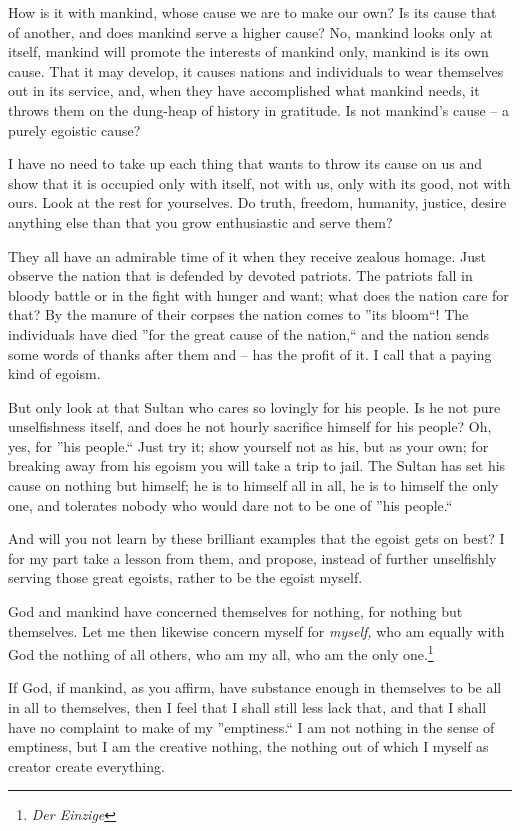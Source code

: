 \documentclass[12pt,a4paper]{book}
\begin{document}
How is it with mankind, whose cause we are to make our own? Is its cause that 
of another, and does mankind serve a higher cause? No, mankind looks only at 
itself, mankind will promote the interests of mankind only, mankind is its own 
cause. That it may develop, it causes nations and individuals to wear 
themselves out in its service, and, when they have accomplished what mankind 
needs, it throws them on the dung-heap of history in gratitude. Is not 
mankind's cause -- a purely egoistic cause?

I have no need to take up each thing that wants to throw its cause on us and 
show that it is occupied only with itself, not with us, only with its good, 
not with ours. Look at the rest for yourselves. Do truth, freedom, humanity, 
justice, desire anything else than that you grow enthusiastic and serve them?

They all have an admirable time of it when they receive zealous homage. Just 
observe the nation that is defended by devoted patriots. The patriots fall in 
bloody battle or in the fight with hunger and want; what does the nation care 
for that? By the manure of their corpses the nation comes to ''its bloom``! 
The individuals have died ''for the great cause of the nation,`` and the 
nation sends some words of thanks after them and -- has the profit of it. I 
call that a paying kind of egoism.

But only look at that Sultan who cares so lovingly for his people. Is he not 
pure unselfishness itself, and does he not hourly sacrifice himself for his 
people? Oh, yes, for ''his people.`` Just try it; show yourself not as his, 
but as your own; for breaking away from his egoism you will take a trip to 
jail. The Sultan has set his cause on nothing but himself; he is to himself 
all in all, he is to himself the only one, and tolerates nobody who would dare 
not to be one of ''his people.``

And will you not learn by these brilliant examples that the egoist gets on 
best? I for my part take a lesson from them, and propose, instead of further 
unselfishly serving those great egoists, rather to be the egoist myself.

God and mankind have concerned themselves for nothing, for nothing but 
themselves. Let me then likewise concern myself for \textit{myself,} who am 
equally with God the nothing of all others, who am my all, who am the only 
one.\footnote{\textit{Der Einzige}}

If God, if mankind, as you affirm, have substance enough in themselves to be 
all in all to themselves, then I feel that I shall still less lack that, and 
that I shall have no complaint to make of my ''emptiness.`` I am not nothing 
in the sense of emptiness, but I am the creative nothing, the nothing out of 
which I myself as creator create everything.
\end{document}
